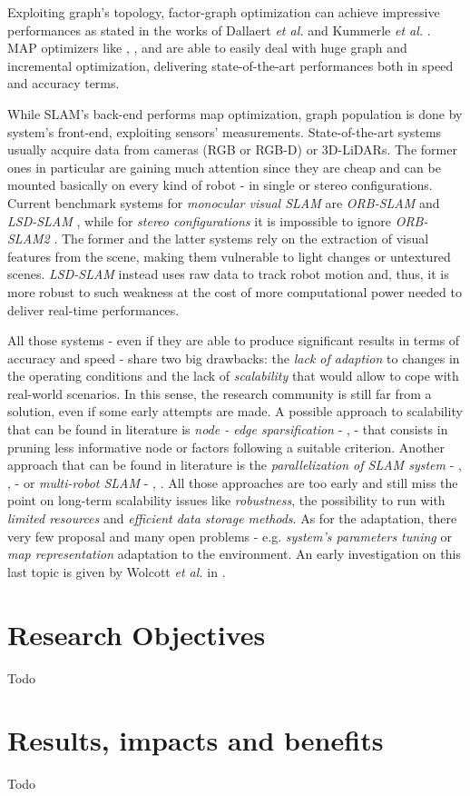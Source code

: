 \documentclass[10pt,a4paper, notitlepage]{report}
\begin{document}
Exploiting graph's topology, factor-graph optimization can achieve impressive performances as stated in the works of Dallaert \textit{et al.} \cite{dellaert2006square} and Kummerle \textit{et al.}  \cite{kummerle2011g}. MAP optimizers like \cite{kummerle2011g}, \cite{dellaert2012gtsam}, \cite{ceres-solver} and \cite{kaess2012isam2} are able to easily deal with huge graph and incremental optimization, delivering state-of-the-art performances both in speed and accuracy terms.

While SLAM's back-end performs map optimization, graph population is done by system's front-end, exploiting sensors' measurements. State-of-the-art systems usually acquire data from cameras (RGB or RGB-D) or 3D-LiDARs. The former ones in particular are gaining much attention since they are cheap and can be mounted basically on every kind of robot - in single or stereo configurations. Current benchmark systems for \textit{monocular visual SLAM} are \textit{ORB-SLAM} \cite{mur2015orb-slam} and \textit{LSD-SLAM} \cite{engel2014lsd-slam}, while for \textit{stereo configurations} it is impossible to ignore \textit{ORB-SLAM2} \cite{mur2017orb-slam2}. The former and the latter systems rely on the extraction of visual features from the scene, making them vulnerable to light changes or untextured scenes. \textit{LSD-SLAM} instead uses raw data to track robot motion and, thus, it is more robust to such weakness at the cost of more computational power needed to deliver real-time performances.

All those systems - even if they are able to produce significant results in terms of accuracy and speed - share two big drawbacks: the \textit{lack of adaption} to changes in the operating conditions and the lack of \textit{scalability} that would allow to cope with real-world scenarios. In this sense, the research community is still far from a solution, even if some early attempts are made. A possible approach to scalability that can be found in literature is \textit{node - edge sparsification} - \cite{kretzschmar2011graph-pruninig}, \cite{huang2013consistent} - that consists in pruning less informative node or factors following a suitable criterion. Another approach that can be found in literature is the \textit{parallelization of SLAM system} -  \cite{ni-dallaert2010nested-dissections}, \cite{ni-dallaert2007tectonicSAM}, \cite{grisetti2010hogman} - or \textit{multi-robot SLAM} - \cite{cunningham2013ddfSAM2}, \cite{lazaro2013mr-slam}. All those approaches are too early and still miss the point on long-term scalability issues like \textit{robustness}, the possibility to run with \textit{limited resources} and \textit{efficient data storage methods}. As for the adaptation, there very few proposal and many open problems - e.g. \textit{system's parameters tuning} or \textit{map representation} adaptation to the environment. An early investigation on this last topic is given by Wolcott \textit{et al.} in \cite{wolcott2014map-adaptation}.

\section*{Research Objectives}
Todo

\section*{Results, impacts and benefits}
Todo






\end{document}
